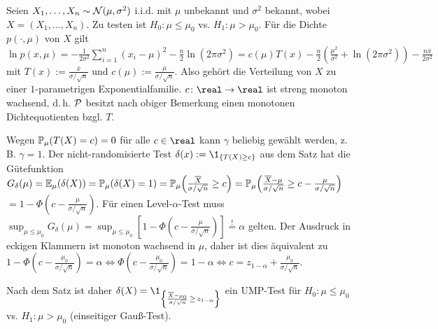 \begin{Bsp}
    Seien $X_1, \dotsc, X_n \sim \N(\mu, \sigma^2)$ i.i.d. mit $\mu$ unbekannt und $\sigma^2$
    bekannt, wobei $X = (X_1, \dotsc, X_n)$.
    Zu testen ist $H_0\colon \mu \le \mu_0$ vs. $H_1\colon \mu > \mu_0$.
    Für die Dichte $p(\cdot, \mu)$ von $X$ gilt\\
    $\ln p(x, \mu) = -\frac{1}{2\sigma^2} \sum_{i=1}^n (x_i - \mu)^2 -
    \frac{n}{2} \ln(2\pi\sigma^2)
    = c(\mu) T(x) - \frac{n}{2} \left(\frac{\mu^2}{\sigma^2} +
    \ln(2\pi\sigma^2)\right) - \frac{n\overline{x}}{2\sigma^2}$\\
    mit $T(x) := \frac{\overline{x}}{\sigma/\sqrt{n}}$ und $c(\mu) := \frac{\mu}{\sigma/\sqrt{n}}$.
    Also gehört die Verteilung von $X$ zu einer $1$-parametrigen Exponentialfamilie.
    $c\colon \real \rightarrow \real$ ist streng monoton wachsend, d.\,h.
    $\P$ besitzt nach obiger Bemerkung einen monotonen Dichtequotienten bzgl. $T$.
    
    Wegen $\PP_\mu(T(X) = c) = 0$ für alle $c \in \real$
    kann $\gamma$ beliebig gewählt werden, z.\,B. $\gamma = 1$.
    Der nicht-randomisierte Test $\delta(x) := \1_{\{T(X) \ge c\}}$ aus dem Satz hat die
    Gütefunktion\\
    $G_\delta(\mu) = \EE_\mu(\delta(X)) = \PP_\mu(\delta(X) = 1) =
    \PP_\mu\!\left(\frac{\overline{X}}{\sigma/\sqrt{n}} \ge c\right)
    = \PP_\mu\!\left(\frac{\overline{X} - \mu}{\sigma/\sqrt{n}} \ge
    c - \frac{\mu}{\sigma/\sqrt{n}}\right)$\\
    $= 1 - \Phi\!\left(c - \frac{\mu}{\sigma/\sqrt{n}}\right)$.
    Für einen Level-$\alpha$-Test muss\\
    $\sup_{\mu \le \mu_0} G_\delta(\mu) =
    \sup_{\mu \le \mu_0} \left[1 - \Phi\!\left(c - \frac{\mu}{\sigma/\sqrt{n}}\right)\right]
    \overset{!}{=} \alpha$ gelten.
    Der Ausdruck in eckigen Klammern ist monoton wachsend in $\mu$, daher ist dies äquivalent zu\\
    $1 - \Phi\!\left(c - \frac{\mu_0}{\sigma/\sqrt{n}}\right) = \alpha
    \iff \Phi\!\left(c - \frac{\mu_0}{\sigma/\sqrt{n}}\right) = 1 - \alpha
    \iff c = z_{1-\alpha} + \frac{\mu_0}{\sigma/\sqrt{n}}$.
    
    Nach dem Satz ist daher
    $\delta(X) = \1_{\left\{\frac{\overline{X} - \mu_0}
    {\sigma/\sqrt{n}} \,\ge\, z_{1-\alpha}\right\}}$
    ein UMP-Test für $H_0\colon \mu \le \mu_0$ vs. $H_1\colon \mu > \mu_0$
    (einseitiger Gauß-Test).
\end{Bsp}


